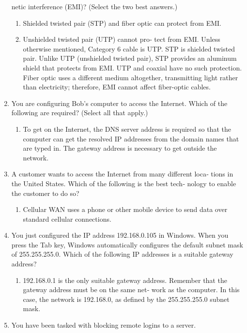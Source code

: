 \documentclass{article}
\begin{document}
\begin{enumerate}
netic interference (EMI)? (Select the two best answers.)
    \begin{enumerate}
        \item Shielded twisted pair (STP) and fiber optic can
protect from EMI. 
        \item Unshielded twisted pair (UTP) cannot pro‐
tect from EMI. Unless otherwise mentioned, Category 6 cable is
UTP. STP is shielded twisted pair. Unlike UTP (unshielded
twisted pair), STP provides an aluminum shield that protects
from EMI. UTP and coaxial have no such protection. Fiber optic
uses a different medium altogether, transmitting light rather than
electricity; therefore, EMI cannot affect fiber-optic cables.
    \end{enumerate}
    \item You are configuring Bob’s computer to access the Internet. Which
of the following are required? (Select all that apply.)
    \begin{enumerate}
        \item To get on the Internet, the DNS server address is
required so that the computer can get the resolved IP addresses
from the domain names that are typed in. The gateway address is
necessary to get outside the network.
    \end{enumerate}
    \item A customer wants to access the Internet from many different loca‐
tions in the United States. Which of the following is the best tech‐
nology to enable the customer to do so?
    \begin{enumerate}
        \item Cellular WAN uses a phone or other mobile device
to send data over standard cellular connections.
    \end{enumerate}
    \item You just configured the IP address 192.168.0.105 in Windows.
When you press the Tab key, Windows automatically configures
the default subnet mask of 255.255.255.0. Which of the following
IP addresses is a suitable gateway address?
    \begin{enumerate}
        \item 192.168.0.1 is the only suitable gateway address.
Remember that the gateway address must be on the same net‐
work as the computer. In this case, the network is 192.168.0, as
defined by the 255.255.255.0 subnet mask.
    \end{enumerate}
    \item You have been tasked with blocking remote logins to a server.

\end{enumerate}
\end{document}
